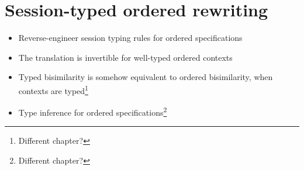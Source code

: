 \chapter{Session-typed ordered rewriting}\label{ch:session-typed-rewriting}

\begin{itemize}
\item Reverse-engineer session typing rules for ordered specifications
\item The translation is invertible for well-typed ordered contexts
\item Typed bisimilarity is somehow equivalent to ordered bisimilarity, when contexts are typed\footnote{Different chapter?}
\item Type inference for ordered specifications\footnote{Different chapter?}
\end{itemize}

